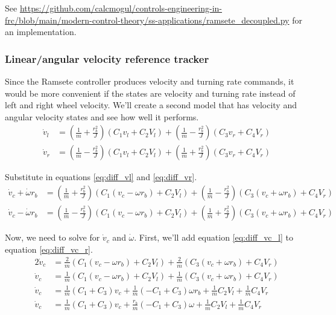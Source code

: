 See
\url{https://github.com/calcmogul/controls-engineering-in-frc/blob/main/modern-control-theory/ss-applications/ramsete_decoupled.py}
for an implementation.

\subsubsection{Linear/angular velocity reference tracker}

Since the Ramsete controller produces velocity and turning rate commands, it
would be more convenient if the \glspl{state} are velocity and turning rate
instead of left and right wheel velocity. We'll create a second model that has
velocity and angular velocity states and see how well it performs.
\begin{align*}
  \dot{v}_l &= \left(\frac{1}{m} + \frac{r_b^2}{J}\right)
    \left(C_1 v_l + C_2 V_l\right) +
    \left(\frac{1}{m} - \frac{r_b^2}{J}\right) \left(C_3 v_r + C_4 V_r\right) \\
  \dot{v}_r &= \left(\frac{1}{m} - \frac{r_b^2}{J}\right)
    \left(C_1 v_l + C_2 V_l\right) +
    \left(\frac{1}{m} + \frac{r_b^2}{J}\right) \left(C_3 v_r + C_4 V_r\right)
\end{align*}

Substitute in equations \eqref{eq:diff_vl} and \eqref{eq:diff_vr}.
\begin{align}
  \dot{v}_c + \dot{\omega} r_b &= \left(\frac{1}{m} + \frac{r_b^2}{J}\right)
    \left(C_1(v_c - \omega r_b) + C_2 V_l\right) +
    \left(\frac{1}{m} - \frac{r_b^2}{J}\right) \left(C_3(v_c + \omega r_b) +
      C_4 V_r\right) \label{eq:diff_vc_l} \\
  \dot{v}_c - \dot{\omega} r_b &= \left(\frac{1}{m} - \frac{r_b^2}{J}\right)
    \left(C_1(v_c - \omega r_b) + C_2 V_l\right) +
    \left(\frac{1}{m} + \frac{r_b^2}{J}\right) \left(C_3(v_c + \omega r_b) +
      C_4 V_r\right) \label{eq:diff_vc_r}
\end{align}

Now, we need to solve for $\dot{v}_c$ and $\dot{\omega}$. First, we'll add
equation \eqref{eq:diff_vc_l} to equation \eqref{eq:diff_vc_r}.
\begin{align*}
  2\dot{v}_c &= \frac{2}{m} \left(C_1(v_c - \omega r_b) + C_2 V_l\right) +
    \frac{2}{m} \left(C_3(v_c + \omega r_b) + C_4 V_r\right) \\
  \dot{v}_c &= \frac{1}{m} \left(C_1(v_c - \omega r_b) + C_2 V_l\right) +
    \frac{1}{m} \left(C_3(v_c + \omega r_b) + C_4 V_r\right) \\
  \dot{v}_c &= \frac{1}{m} (C_1 + C_3) v_c +
    \frac{1}{m} (-C_1 + C_3) \omega r_b + \frac{1}{m} C_2 V_l +
    \frac{1}{m} C_4 V_r \\
  \dot{v}_c &= \frac{1}{m} (C_1 + C_3) v_c + \frac{r_b}{m} (-C_1 + C_3) \omega +
    \frac{1}{m} C_2 V_l + \frac{1}{m} C_4 V_r
\end{align*}

